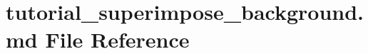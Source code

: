 \hypertarget{tutorial__superimpose__background_8md}{}\section{tutorial\+\_\+superimpose\+\_\+background.\+md File Reference}
\label{tutorial__superimpose__background_8md}
